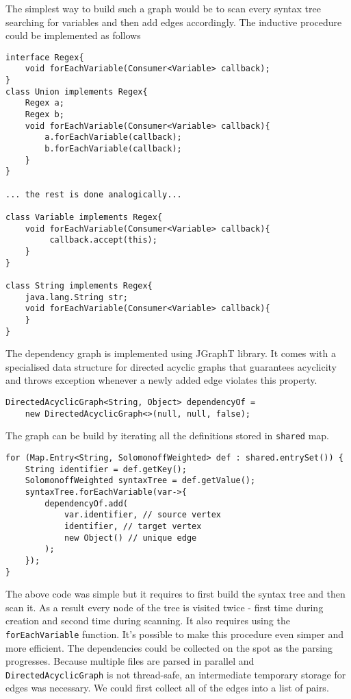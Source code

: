 The simplest way to build such a graph would be to scan every syntax tree searching for variables and then add edges accordingly. The inductive procedure could be implemented as follows
\begin{lstlisting}
interface Regex{
    void forEachVariable(Consumer<Variable> callback);
}
class Union implements Regex{
    Regex a; 
    Regex b;
    void forEachVariable(Consumer<Variable> callback){
        a.forEachVariable(callback);
        b.forEachVariable(callback);
    }
}

... the rest is done analogically...

class Variable implements Regex{
    void forEachVariable(Consumer<Variable> callback){
         callback.accept(this);
    }
}

class String implements Regex{
    java.lang.String str;
    void forEachVariable(Consumer<Variable> callback){
    }
}
\end{lstlisting}
The dependency graph is implemented using JGraphT library. It comes with a specialised data structure for directed acyclic graphs that guarantees acyclicity and throws exception whenever a newly added edge violates this property.
\begin{lstlisting}
DirectedAcyclicGraph<String, Object> dependencyOf =
    new DirectedAcyclicGraph<>(null, null, false);
\end{lstlisting}
The graph can be build by iterating all the definitions stored in \texttt{shared} map.
\begin{lstlisting}
for (Map.Entry<String, SolomonoffWeighted> def : shared.entrySet()) {
    String identifier = def.getKey();
    SolomonoffWeighted syntaxTree = def.getValue();
    syntaxTree.forEachVariable(var->{
        dependencyOf.add(
            var.identifier, // source vertex
            identifier, // target vertex
            new Object() // unique edge
        );
    });
}
\end{lstlisting}
The above code was simple but it requires to first build the syntax tree and then scan it. As a result every node of the tree is visited twice - first time during creation and second time during scanning. It also requires using the 
\texttt{forEachVariable} function. It's possible to make this procedure even simper and more efficient. The dependencies could be collected on the spot as the parsing progresses. Because multiple files are parsed in parallel
and \texttt{DirectedAcyclicGraph} is not thread-safe, an intermediate temporary storage for edges was necessary. We could first collect all of the edges into a list of pairs.
